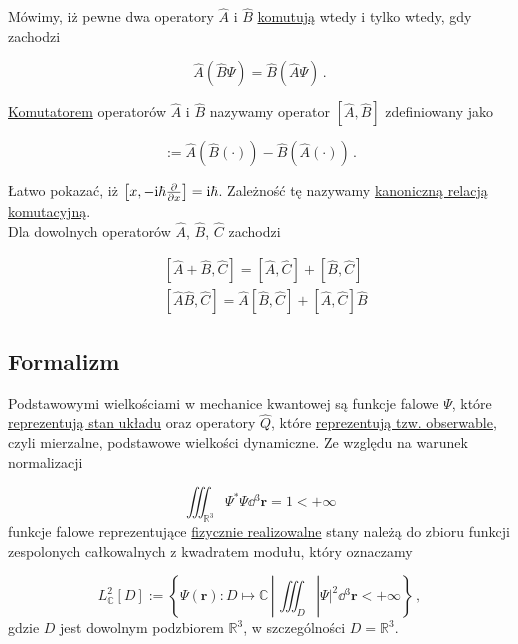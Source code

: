 \documentclass{myclass}
\begin{document}
Mówimy, iż pewne dwa operatory \(\hat{A}\) i \(\hat{B}\) \underline{komutują} wtedy i tylko wtedy,
gdy zachodzi

\begin{equation*}
    \hat{A}(\hat{B}\Psi)=\hat{B}(\hat{A}\Psi)\,.
\end{equation*}

\underline{Komutatorem} operatorów \(\hat{A}\) i \(\hat{B}\) nazywamy operator \([\hat{A},\hat{B}]\)
zdefiniowany jako

\begin{equation*}
    [\hat{A},\hat{B}]:=\hat{A}(\hat{B}(\cdot))-\hat{B}(\hat{A}(\cdot))\,.
\end{equation*}

Łatwo pokazać, iż \(\left[x,-\mathrm{i}\hbar\pdv{ }{x}\right]=\mathrm{i}\hbar\). Zależność tę nazywamy
\underline{kanoniczną relacją komutacyjną}.\\
Dla dowolnych operatorów \(\hat{A}\), \(\hat{B}\), \(\hat{C}\) zachodzi

\begin{equation*}
    \begin{split}
        &[\hat{A}+\hat{B},\hat{C}]=[\hat{A},\hat{C}]+[\hat{B},\hat{C}]\\
        &[\hat{A}\hat{B},\hat{C}]=\hat{A}[\hat{B},\hat{C}]+[\hat{A},\hat{C}]\hat{B}
    \end{split}
\end{equation*}

\subsection{Formalizm}

Podstawowymi wielkościami w mechanice kwantowej są funkcje falowe \(\Psi\), które
\underline{reprezentują stan układu} oraz operatory \(\hat{Q}\), które \underline{reprezentują tzw.
obserwable}, czyli mierzalne, podstawowe wielkości dynamiczne. Ze względu na warunek normalizacji

\begin{equation*}
\iiint_{\mathbb{R}^3}\Psi^*\Psi\dd{^3\mathbf{r}}=1<+\infty
\end{equation*}
funkcje falowe reprezentujące \underline{fizycznie realizowalne} stany należą do zbioru funkcji
zespolonych całkowalnych z kwadratem modułu, który oznaczamy

\begin{equation*}
L^2_\mathbb{C}[D]:=\left\{\Psi(\mathbf{r}):D\mapsto \mathbb{C}\,|\, \iiint_{D}|\Psi|^2\dd{^3\mathbf{r}}<+\infty\right\}\,,
\end{equation*}
gdzie \(D\) jest dowolnym podzbiorem \(\mathbb{R}^3\), w szczególności \(D=\mathbb{R}^3\).
\end{document}
